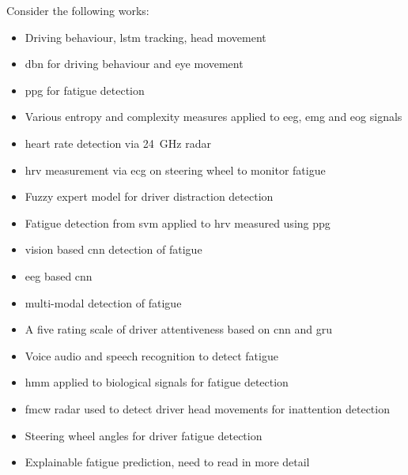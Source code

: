 \documentclass[11pt, parskip=half*,twoside=false]{scrbook}
\begin{document}
Consider the following works:
\begin{itemize}
 	\item \citet{wollmerOnlineDriverDistraction2011} Driving behaviour, \gls{lstm} tracking, head movement
	\item \citet{liangHybridBayesianNetwork2014} \gls{dbn} for driving behaviour and eye movement
	\item \citet{kurianDrowsinessDetectionUsing2014a} \gls{ppg} for fatigue detection
	\item \citet{zhangAutomatedDetectionDriver2014} Various entropy and complexity measures applied to \gls{eeg}, \gls{emg} and \gls{eog} signals
	\item \citet{tsuchiyaHeartbeatDetectionTechnology2020} heart rate detection via 24~GHz radar
	\item \citet{jungDriverFatigueDrowsiness2014} \gls{hrv} measurement via \gls{ecg} on steering wheel to monitor fatigue
	\item \citet{aksjonovDetectionEvaluationDriver2019} Fuzzy expert model for driver distraction detection
	\item \citet{liDetectionDriverDrowsiness2013} Fatigue detection from \gls{svm} applied to \gls{hrv} measured using \gls{ppg} 
	\item \citet{yuDriverDrowsinessDetection2019} vision based \gls{cnn} detection of fatigue
	\item \citet{gaoEEGBasedSpatioTemporal2019} \gls{eeg} based \gls{cnn}
	\item \citet{crayeMultiModalDriverFatigue2016} multi-modal detection of fatigue
	\item \citet{duaAutoRateHowAttentive2019}  A five rating scale of driver attentiveness based on \gls{cnn} and \gls{gru}
	\item \citet{greeleyDetectingFatigueVoice2006} Voice audio and speech recognition to detect fatigue
	\item \citet{fuDynamicDriverFatigue2016} \gls{hmm} applied to biological signals for fatigue detection
	\item \citet{dingInattentiveDrivingBehavior2019} \gls{fmcw} radar used to detect driver head movements for inattention detection
	\item \citet{liOnlineDetectionDriver2017} Steering wheel angles for driver fatigue detection
	\item \citet{zhouPredictingDriverFatigue2021} Explainable fatigue prediction, need to read in more detail
	
\end{itemize}
\end{document}
